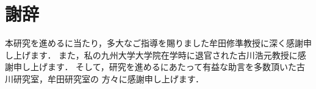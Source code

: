 \chapter{謝辞}
本研究を進めるに当たり，多大なご指導を賜りました牟田修準教授に深く感謝申し上げます．
また，私の九州大学大学院在学時に退官された古川浩元教授に感謝申し上げます．
そして，研究を進めるにあたって有益な助言を多数頂いた古川研究室，牟田研究室の
方々に感謝申し上げます．